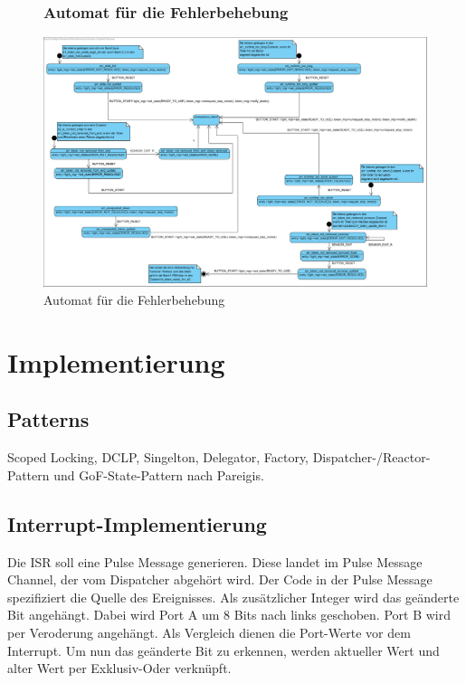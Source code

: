 \documentclass[oneside,a4paper,titlepage]{scrartcl}              %
\begin{document}
\begin{figure}[p]
  \subsubsection{Automat für die Fehlerbehebung}
  \centering\includegraphics[angle=90,scale=0.63]{imgs/Error_FSM.png}
  \caption{Automat für die Fehlerbehebung}
\end{figure}


\section{Implementierung}

\subsection{Patterns}
Scoped Locking, DCLP, Singelton, Delegator, Factory, Dispatcher-/Reactor-Pattern und GoF-State-Pattern nach Pareigis.

\subsection{Interrupt-Implementierung}
Die ISR soll eine Pulse Message generieren. Diese landet im Pulse Message Channel, der vom Dispatcher abgehört wird.
Der Code in der Pulse Message spezifiziert die Quelle des Ereignisses. Als zusätzlicher Integer wird das geänderte Bit angehängt. Dabei wird Port A um 8 Bits nach links geschoben. Port B wird per Veroderung angehängt. Als Vergleich dienen die Port-Werte vor dem Interrupt. Um nun das geänderte Bit zu erkennen, werden aktueller Wert und alter Wert per Exklusiv-Oder verknüpft.
\end{document}
